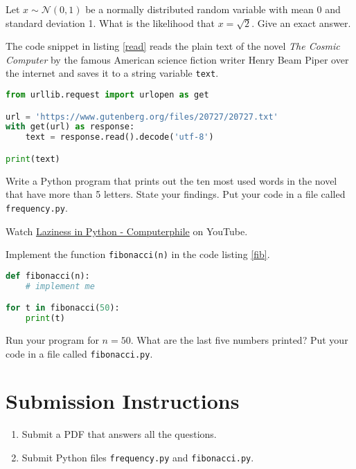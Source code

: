 \documentclass{homework}
\begin{document}

\question Let $x \sim \mathcal{N}(0, 1)$ be a normally distributed random variable with mean 0 and standard deviation 1.  What is the likelihood that $x=\sqrt{2}$. Give an exact answer.


\question The code snippet in listing \ref{read} reads the plain text of the novel \textit{The Cosmic Computer} by the famous American science fiction writer Henry Beam Piper over the internet and saves it to a string variable \texttt{text}.

\begin{lstlisting}[language=python, label=read, caption={A Python program to download the text of the \textit{The Cosmic Computer} by Piper.}]
from urllib.request import urlopen as get

url = 'https://www.gutenberg.org/files/20727/20727.txt'
with get(url) as response:
    text = response.read().decode('utf-8')

print(text)
\end{lstlisting}

Write a Python program that prints out the ten most used words in the novel that have more than 5 letters. State your findings. Put your code in a file called \texttt{frequency.py}.


\question Watch \href{https://www.youtube.com/watch?v=5jwV3zxXc8E}{Laziness in Python - Computerphile} on YouTube.

Implement the function \texttt{fibonacci(n)} in the code listing \ref{fib}.


\begin{lstlisting}[language=python, label=fib, caption={A Python 3 program to print out the first $n \geq 0$ Fibonacci numbers.}]
def fibonacci(n):
    # implement me

for t in fibonacci(50):
    print(t)
\end{lstlisting}

Run your program for $n=50$. What are the last five numbers printed? Put your code in a file called \texttt{fibonacci.py}.


\section*{Submission Instructions}

\begin{enumerate}
  \item Submit a PDF that answers all the questions.
  \item Submit Python files \eg \texttt{frequency.py} and \texttt{fibonacci.py}.
\end{enumerate}
\end{document}
